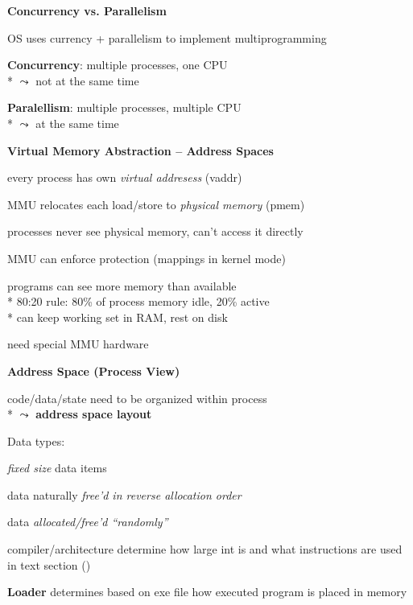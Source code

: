 \textbf{Concurrency vs. Parallelism}
\begin{items}
	\item OS uses currency + parallelism to implement multiprogramming
	\begin{enumeration}
		\item \textbf{Concurrency}: multiple processes, one CPU \\* \( \leadsto \) not at the same time
		\item \textbf{Paralellism}: multiple processes, multiple CPU \\* \( \leadsto \) at the same time
	\end{enumeration}
\end{items}

\textbf{Virtual Memory Abstraction -- Address Spaces}
\begin{items}
	\item every process has own \emph{virtual addresess} (vaddr)
	\item MMU relocates each load/store to \emph{physical memory} (pmem)
	\item processes never see physical memory, can't access it directly
	\item \textcolor{black!60!green}{\code{+}} MMU can enforce protection (mappings in kernel mode)
	\item \textcolor{black!60!green}{\code{+}} programs can see more memory than available \\*
		\phantom{x} 80:20 rule: 80\% of process memory idle, 20\% active \\*
		\phantom{x} can keep working set in RAM, rest on disk
	\item \textcolor{red}{\code{-}} need special MMU hardware
\end{items}

\textbf{Address Space (Process View)}
\begin{items}
	\item code/data/state need to be organized within process \\*
		\( \leadsto \) \textbf{address space layout}
	\item Data types:
	\begin{enumeration}
		\item \emph{fixed size} data items
		\item data naturally \emph{free'd in reverse allocation order}
		\item data \emph{allocated/free'd "`randomly"'}
	\end{enumeration}
	\item compiler/architecture determine how large int is and what instructions are used in text section ()
	\item \textbf{Loader} determines based on exe file how executed program is placed in memory
\end{items}

